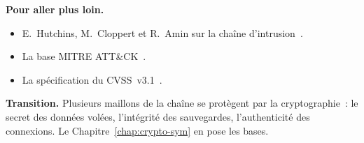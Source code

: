 \bigskip

\begin{boxinfo}
\textbf{Pour aller plus loin.}
\begin{itemize}
    \item E.~Hutchins, M.~Cloppert et R.~Amin sur la chaîne
          d'intrusion~\cite{hutchins2011}.
    \item La base MITRE ATT\&CK~\cite{strom2018mitre}.
    \item La spécification du CVSS~v3.1~\cite{first2019cvss}.
\end{itemize}
\end{boxinfo}

\begin{boxinfo}
\textbf{Transition.} Plusieurs maillons de la chaîne se protègent par la
cryptographie~: le secret des données volées, l'intégrité des sauvegardes,
l'authenticité des connexions. Le Chapitre~\ref{chap:crypto-sym} en pose
les bases.
\end{boxinfo}
